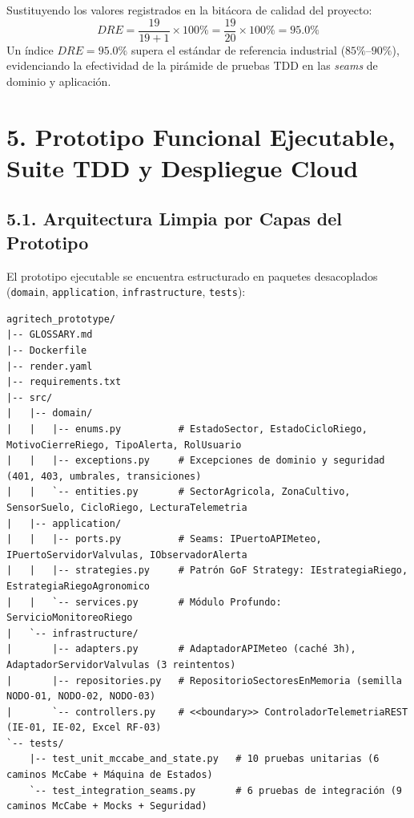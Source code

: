 \documentclass[12pt,letterpaper]{report}
\begin{document}
Sustituyendo los valores registrados en la bitácora de calidad del proyecto:
\[
    DRE = \frac{19}{19 + 1} \times 100\% = \frac{19}{20} \times 100\% = \mathbf{95.0\%}
\]
Un índice $DRE = 95.0\%$ supera el estándar de referencia industrial ($85\%$–$90\%$), evidenciando la efectividad de la pirámide de pruebas TDD en las \textit{seams} de dominio y aplicación.

\newpage
\section*{5. Prototipo Funcional Ejecutable, Suite TDD y Despliegue Cloud}

\subsection*{5.1. Arquitectura Limpia por Capas del Prototipo}

El prototipo ejecutable se encuentra estructurado en paquetes desacoplados (\texttt{domain}, \texttt{application}, \texttt{infrastructure}, \texttt{tests}):

\begin{lstlisting}[style=pythonstyle, caption={Árbol de directorios del prototipo ejecutable AgriTech Precision.}]
agritech_prototype/
|-- GLOSSARY.md
|-- Dockerfile
|-- render.yaml
|-- requirements.txt
|-- src/
|   |-- domain/
|   |   |-- enums.py          # EstadoSector, EstadoCicloRiego, MotivoCierreRiego, TipoAlerta, RolUsuario
|   |   |-- exceptions.py     # Excepciones de dominio y seguridad (401, 403, umbrales, transiciones)
|   |   `-- entities.py       # SectorAgricola, ZonaCultivo, SensorSuelo, CicloRiego, LecturaTelemetria
|   |-- application/
|   |   |-- ports.py          # Seams: IPuertoAPIMeteo, IPuertoServidorValvulas, IObservadorAlerta
|   |   |-- strategies.py     # Patrón GoF Strategy: IEstrategiaRiego, EstrategiaRiegoAgronomico
|   |   `-- services.py       # Módulo Profundo: ServicioMonitoreoRiego
|   `-- infrastructure/
|       |-- adapters.py       # AdaptadorAPIMeteo (caché 3h), AdaptadorServidorValvulas (3 reintentos)
|       |-- repositories.py   # RepositorioSectoresEnMemoria (semilla NODO-01, NODO-02, NODO-03)
|       `-- controllers.py    # <<boundary>> ControladorTelemetriaREST (IE-01, IE-02, Excel RF-03)
`-- tests/
    |-- test_unit_mccabe_and_state.py   # 10 pruebas unitarias (6 caminos McCabe + Máquina de Estados)
    `-- test_integration_seams.py       # 6 pruebas de integración (9 caminos McCabe + Mocks + Seguridad)
\end{lstlisting}
\end{document}
